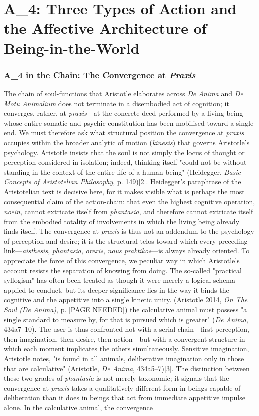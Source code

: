 \documentclass{article}
\begin{document}
\section{A\_4: Three Types of Action and the Affective Architecture of Being-in-the-World}

\subsubsection*{A\_4 in the Chain: The Convergence at \textit{Praxis}} The chain of soul-functions that Aristotle elaborates across \textit{De Anima} and \textit{De Motu Animalium} does not terminate in a disembodied act of cognition; it converges, rather, at \textit{praxis}---at the concrete deed performed by a living being whose entire somatic and psychic constitution has been mobilised toward a single end. We must therefore ask what structural position the convergence at \textit{praxis} occupies within the broader analytic of motion (\textit{kinēsis}) that governs Aristotle's psychology. Aristotle insists that the soul is not simply the locus of thought or perception considered in isolation; indeed, thinking itself "could not be without standing in the context of the entire life of a human being" (Heidegger, \textit{Basic Concepts of Aristotelian Philosophy}, p. 149)[2]. Heidegger's paraphrase of the Aristotelian text is decisive here, for it makes visible what is perhaps the most consequential claim of the action-chain: that even the highest cognitive operation, \textit{noein}, cannot extricate itself from \textit{phantasia}, and therefore cannot extricate itself from the embodied totality of involvements in which the living being already finds itself. The convergence at \textit{praxis} is thus not an addendum to the psychology of perception and desire; it is the structural telos toward which every preceding link---\textit{aisthēsis}, \textit{phantasia}, \textit{orexis}, \textit{nous praktikos}---is always already oriented. To appreciate the force of this convergence, we peculiar way in which Aristotle's account resists the separation of knowing from doing. The so-called "practical syllogism" has often been treated as though it were merely a logical schema applied to conduct, but its deeper significance lies in the way it binds the cognitive and the appetitive into a single kinetic unity. (Aristotle 2014, \textit{On The Soul (De Anima)}, p. [PAGE NEEDED]) the calculative animal must possess "a single standard to measure by, for that is pursued which is greater" (\textit{De Anima}, 434a7--10). The user is thus confronted not with a serial chain---first perception, then imagination, then desire, then action---but with a convergent structure in which each moment implicates the others simultaneously. Sensitive imagination, Aristotle notes, "is found in all animals, deliberative imagination only in those that are calculative" (Aristotle, \textit{De Anima}, 434a5--7)[3]. The distinction between these two grades of \textit{phantasia} is not merely taxonomic; it signals that the convergence at \textit{praxis} takes a qualitatively different form in beings capable of deliberation than it does in beings that act from immediate appetitive impulse alone. In the calculative animal, the convergence 
\end{document}

